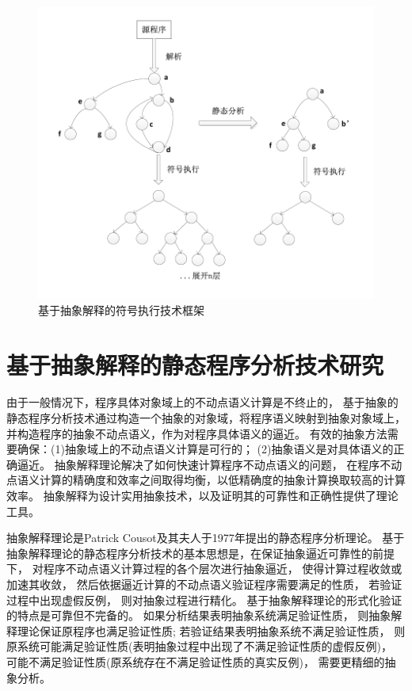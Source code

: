 \begin{figure}[h]
	\centering
	\includegraphics{figures/chap04/framework.pdf}
	\caption{基于抽象解释的符号执行技术框架}
	\label{fig-framework}
\end{figure}




\section{基于抽象解释的静态程序分析技术研究}
\label{sec-absint}

由于一般情况下，程序具体对象域上的不动点语义计算是不终止的，
基于抽象的静态程序分析技术通过构造一个抽象的对象域，将程序语义映射到抽象对象域上，
并构造程序的抽象不动点语义，作为对程序具体语义的逼近。
有效的抽象方法需要确保：(1)抽象域上的不动点语义计算是可行的；
(2)抽象语义是对具体语义的正确逼近。
抽象解释理论解决了如何快速计算程序不动点语义的问题，
在程序不动点语义计算的精确度和效率之间取得均衡，以低精确度的抽象计算换取较高的计算效率。
抽象解释为设计实用抽象技术，以及证明其的可靠性和正确性提供了理论工具。

抽象解释理论是Patrick Cousot及其夫人于1977年提出的静态程序分析理论。
基于抽象解释理论的静态程序分析技术的基本思想是，在保证抽象逼近可靠性的前提下，
对程序不动点语义计算过程的各个层次进行抽象逼近， 使得计算过程收敛或加速其收敛，
然后依据逼近计算的不动点语义验证程序需要满足的性质，
若验证过程中出现虚假反例， 则对抽象过程进行精化。
基于抽象解释理论的形式化验证的特点是可靠但不完备的。
如果分析结果表明抽象系统满足验证性质， 则抽象解释理论保证原程序也满足验证性质;
若验证结果表明抽象系统不满足验证性质，
则原系统可能满足验证性质(表明抽象过程中出现了不满足验证性质的虚假反例)，
可能不满足验证性质(原系统存在不满足验证性质的真实反例)， 需要更精细的抽象分析。



